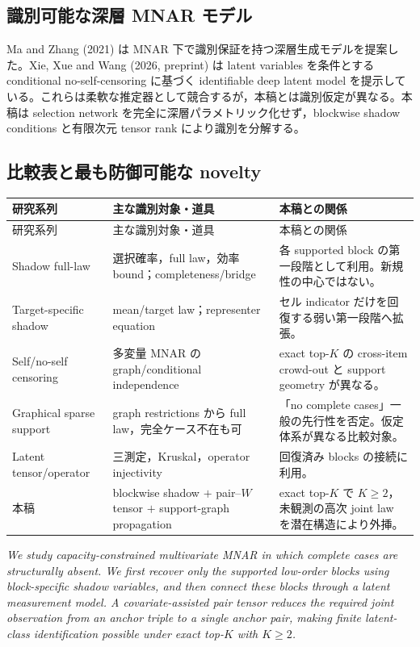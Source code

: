 \documentclass[11pt,a4paper]{ltjsarticle}
\theoremstyle{remark}\newtheorem{remark}{注意}[section]
\begin{document}
\subsection{識別可能な深層 MNAR モデル}
Ma and Zhang (2021) は MNAR 下で識別保証を持つ深層生成モデルを提案した。Xie, Xue and Wang (2026, preprint) は latent variables を条件とする conditional no-self-censoring に基づく identifiable deep latent model を提示している。これらは柔軟な推定器として競合するが，本稿とは識別仮定が異なる。本稿は selection network を完全に深層パラメトリック化せず，blockwise shadow conditions と有限次元 tensor rank により識別を分解する。

\subsection{比較表と最も防御可能な novelty}
\begin{longtable}{p{}p{}p{}}
\toprule
研究系列 & 主な識別対象・道具 & 本稿との関係 \\
\midrule\endfirsthead
\toprule 研究系列 & 主な識別対象・道具 & 本稿との関係 \\
\midrule\endhead
Shadow full-law & 選択確率，full law，効率 bound；completeness/bridge & 各 supported block の第一段階として利用。新規性の中心ではない。\\
Target-specific shadow & mean/target law；representer equation & セル indicator だけを回復する弱い第一段階へ拡張。\\
Self/no-self censoring & 多変量 MNAR の graph/conditional independence & exact top-$K$ の cross-item crowd-out と support geometry が異なる。\\
Graphical sparse support & graph restrictions から full law，完全ケース不在も可 & 「no complete cases」一般の先行性を否定。仮定体系が異なる比較対象。\\
Latent tensor/operator & 三測定，Kruskal，operator injectivity & 回復済み blocks の接続に利用。\\
本稿 & blockwise shadow $+$ pair--$W$ tensor $+$ support-graph propagation & exact top-$K$ で $K\ge2$，未観測の高次 joint law を潜在構造により外挿。\\
\bottomrule
\end{longtable}

\begin{tcolorbox}[colback=soft,colframe=navy,boxrule=.8pt,arc=2mm,title=推奨する novelty statement]
\emph{We study capacity-constrained multivariate MNAR in which complete cases are structurally absent.  We first recover only the supported low-order blocks using block-specific shadow variables, and then connect these blocks through a latent measurement model.  A covariate-assisted pair tensor reduces the required joint observation from an anchor triple to a single anchor pair, making finite latent-class identification possible under exact top-$K$ with $K\ge2$.}
\end{tcolorbox}
\end{document}
